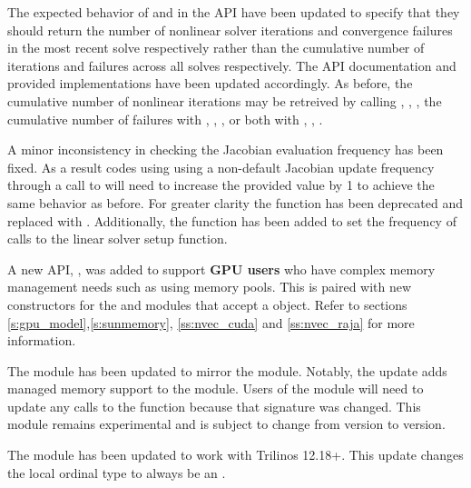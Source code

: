 The expected behavior of  and
 in the {\sunnonlinsol} API have been updated to
specify that they should return the number of nonlinear solver iterations and
convergence failures in the most recent solve respectively rather than the
cumulative number of iterations and failures across all solves respectively. The
API documentation and {\sundials} provided {\sunnonlinsol} implementations have
been updated accordingly. As before, the cumulative number of nonlinear
iterations may be retreived by calling ,
, ,
the cumulative number of failures with ,
,
, or both with
, ,
.

A minor inconsistency in checking the Jacobian evaluation frequency has been
fixed. As a result codes using using a non-default Jacobian update frequency
through a call to  will need to increase the
provided value by 1 to achieve the same behavior as before. For greater clarity
the function  has been deprecated and replaced
with . Additionally, the function
 has been added to set the frequency of calls to the
linear solver setup function.

A new API, , was added to support \textbf{GPU users} who
have complex memory management needs such as using memory pools. This is paired
with new constructors for the {\nveccuda} and {\nvecraja} modules that accept a
 object. Refer to sections
\ref{s:gpu_model},\ref{s:sunmemory}, \ref{ss:nvec_cuda} and \ref{ss:nvec_raja}
for more information.

The  module has been updated to mirror the 
module. Notably, the update adds managed memory support to the
 module. Users of the module will need to update any calls to
the  function because that signature was changed. This module
remains experimental and is subject to change from version to version.

The  module has been updated to work with Trilinos 12.18+.
This update changes the local ordinal type to always be an .

